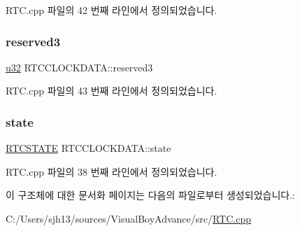 R\+T\+C.\+cpp 파일의 42 번째 라인에서 정의되었습니다.

\mbox{\label{struct_r_t_c_c_l_o_c_k_d_a_t_a_af852b907782adf7d24694ceadaebf008}} 
\subsubsection{\texorpdfstring{reserved3}{reserved3}}
{\footnotesize\ttfamily \mbox{\hyperlink{_system_8h_a10e94b422ef0c20dcdec20d31a1f5049}{u32}} R\+T\+C\+C\+L\+O\+C\+K\+D\+A\+T\+A\+::reserved3}



R\+T\+C.\+cpp 파일의 43 번째 라인에서 정의되었습니다.

\mbox{\label{struct_r_t_c_c_l_o_c_k_d_a_t_a_aff7d87dd71426276629f84e79cf3e77a}} 
\subsubsection{\texorpdfstring{state}{state}}
{\footnotesize\ttfamily \mbox{\hyperlink{_r_t_c_8cpp_a54e09f92e494a3c69e989df3d1129367}{R\+T\+C\+S\+T\+A\+TE}} R\+T\+C\+C\+L\+O\+C\+K\+D\+A\+T\+A\+::state}



R\+T\+C.\+cpp 파일의 38 번째 라인에서 정의되었습니다.



이 구조체에 대한 문서화 페이지는 다음의 파일로부터 생성되었습니다.\+:\begin{DoxyCompactItemize}
\item 
C\+:/\+Users/sjh13/sources/\+Visual\+Boy\+Advance/src/\mbox{\hyperlink{_r_t_c_8cpp}{R\+T\+C.\+cpp}}\end{DoxyCompactItemize}
